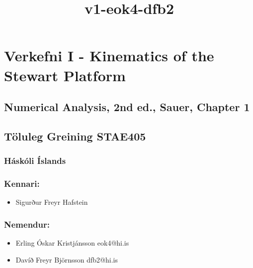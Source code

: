 \documentclass[11pt]{article}
\title{v1-eok4-dfb2}
\providecommand{\tightlist}{%
      \setlength{\itemsep}{0pt}\setlength{\parskip}{0pt}}
\begin{document}
    
    
    \maketitle
    
    

    
    \section{Verkefni I - Kinematics of the Stewart
Platform}\label{verkefni-i---kinematics-of-the-stewart-platform}

\subsection{Numerical Analysis, 2nd ed., Sauer, Chapter
1}\label{numerical-analysis-2nd-ed.-sauer-chapter-1}

\subsection{Töluleg Greining STAE405}\label{tuxf6luleg-greining-stae405}

\subsubsection{Háskóli Íslands}\label{huxe1skuxf3li-uxedslands}

\subsubsection{Kennari:}\label{kennari}

\begin{itemize}
\tightlist
\item
  Sigurður Freyr Hafstein
\end{itemize}

\subsubsection{Nemendur:}\label{nemendur}

\begin{itemize}
\tightlist
\item
  Erling Óskar Kristjánsson eok4@hi.is
\item
  Davíð Freyr Björnsson dfb2@hi.is
\end{itemize}
\end{document}
